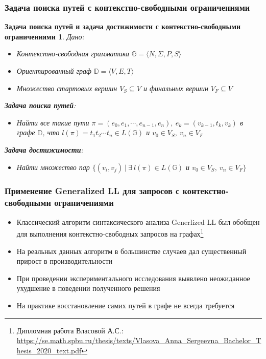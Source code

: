 \documentclass{beamer}
\newtheorem{task}{Задача поиска путей и задача достижимости с контекстно-свободными ограничениями}
\begin{document}
\begin{frame}[fragile]
  \transwipe[direction=90]
  \frametitle{Задача поиска путей с контекстно-свободными ограничениями}
   \begin{task}
  Дано:
     \begin{itemize}
    \item Контекстно-свободная грамматика $\mathbb{G}  = \langle N, \Sigma, P, S \rangle$
     \item Ориентированный граф $ \mathbb{D} = \langle V, E, T \rangle$
     \item Множество стартовых вершин $V_S \subseteq V$  и финальных вершин \mbox{$V_F \subseteq V$}
\end{itemize} 
\textbf{Задача поиска путей}:
\begin{itemize}
    \item Найти все такие пути $\pi = (e_0, e_1, \cdots, e_{n - 1}, e_n), ~ e_k = (v_{k - 1}, t_k, v_k)$ в графе $ \mathbb{D}$, что $l(\pi) = t_1t_2 \cdots t_n \in L(\mathbb{G})$ и $v_0 \in V_S, ~v_n \in V_F$
\end{itemize}
\textbf{Задача достижимости}:
\begin{itemize}
    \item Найти множество пар $\{(v_i, v_j ) ~|~ \exists ~l(\pi) \in L(\mathbb{G})$ и $v_0 \in V_S, ~v_n \in V_F\}$
\end{itemize}
 \end{task}
\end{frame}

\begin{frame}[fragile]
  \transwipe[direction=90]
  \frametitle{Применение Generalized LL для запросов с контекстно-свободными ограничениями}
  \begin{itemize}
      \item Классический алгоритм синтаксического анализа Generlized LL был обобщен для выполнения контекстно-свободных запросов на графах\footnote{Дипломная работа Власовой А.С.: \url{https://se.math.spbu.ru/thesis/texts/Vlasova_Anna_Sergeevna_Bachelor_Thesis_2020_text.pdf}}
      \item На реальных данных алгоритм в большинстве случаев дал существенный прирост в производительности
      \item При проведении экспериментального исследования выявлено неожиданное ухудшение в поведении полученного решения
      \item На практике восстановление самих путей в графе не всегда требуется
\end{itemize}
\end{frame}
\end{document}

